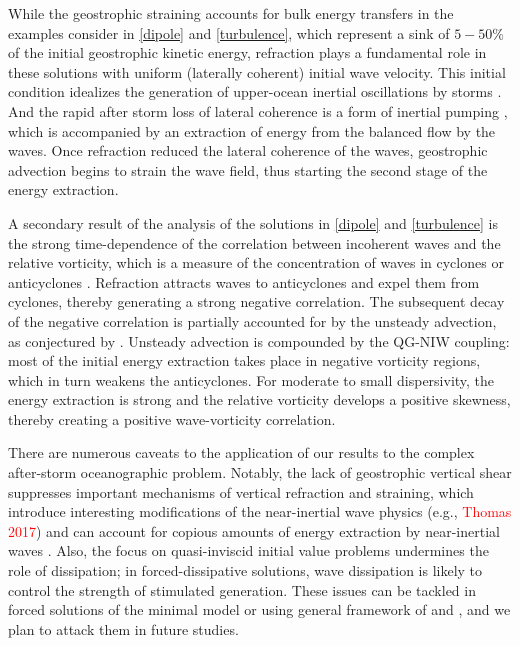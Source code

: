 \documentclass{jfm}
\begin{document}
While the geostrophic straining accounts for bulk energy transfers in the examples
consider in \ref{dipole} and \ref{turbulence}, which represent a sink of
$5-50\%$ of the initial geostrophic kinetic energy, refraction plays a fundamental role
in these solutions with uniform (laterally coherent) initial wave velocity.
 This initial condition idealizes the
generation of upper-ocean inertial oscillations by storms
\citep[e.g., ][]{danioux_etal2015,moehlis_llewellynsmith2001}. And the rapid after
storm loss of lateral coherence is a form of inertial pumping
 \citep{young_benjelloul1997,klein_etal2004}, which
 is accompanied by an extraction of energy from the balanced flow by the waves.
Once refraction reduced the lateral coherence of the waves, geostrophic advection
begins to strain the wave field, thus starting the second stage of the energy
extraction.

A secondary result of the analysis of the solutions in \ref{dipole} and \ref{turbulence}
is the strong time-dependence of the correlation between incoherent waves and
the relative vorticity, which is a measure of the concentration of waves in cyclones or
anticyclones \citep{danioux_etal2015}. Refraction attracts waves to anticyclones
and expel them from cyclones, thereby generating a strong negative correlation.
The subsequent decay of the negative correlation is partially accounted
for by the unsteady advection, as conjectured by \cite{danioux_etal2015}. Unsteady
advection is compounded by the QG-NIW coupling: most of the initial energy
extraction takes place in negative vorticity regions, which in turn weakens the
anticyclones. For moderate to small dispersivity, the energy extraction is strong
and the relative vorticity develops a positive skewness, thereby creating a positive
wave-vorticity correlation.

There are numerous caveats to the application of our results to the complex
after-storm oceanographic problem. Notably, the lack of geostrophic
vertical shear suppresses important mechanisms of vertical refraction and
straining, which introduce interesting modifications of the near-inertial wave
physics (e.g., \textcolor{red}{Thomas 2017}) and can account for copious amounts
of energy extraction by near-inertial waves \citep{shakespeare_hogg2017}. Also,
the focus on quasi-inviscid initial value problems undermines the role of
dissipation; in forced-dissipative solutions, wave dissipation is likely to control
the strength of stimulated generation. These issues can be tackled in forced solutions
of the minimal model or using general framework of \cite{xie_vanneste2015}
and \cite{wagner_young2016}, and we plan to attack them in future studies.
\end{document}
